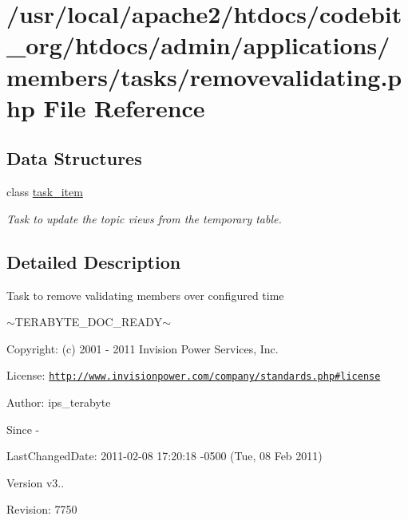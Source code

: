 \hypertarget{removevalidating_8php}{\section{/usr/local/apache2/htdocs/codebit\-\_\-org/htdocs/admin/applications/members/tasks/removevalidating.php File Reference}
\label{removevalidating_8php}
}
\subsection*{Data Structures}
\begin{DoxyCompactItemize}
\item 
class \hyperlink{classtask__item}{task\-\_\-item}
\begin{DoxyCompactList}\small\item\em Task to update the topic views from the temporary table. \end{DoxyCompactList}\end{DoxyCompactItemize}


\subsection{Detailed Description}
\begin{DoxyVerb}  Task to remove validating members over configured time
\end{DoxyVerb}
 $\sim$\-T\-E\-R\-A\-B\-Y\-T\-E\-\_\-\-D\-O\-C\-\_\-\-R\-E\-A\-D\-Y$\sim$ \begin{DoxyParagraph}{Copyright\-:}
(c) 2001 -\/ 2011 Invision Power Services, Inc.
\end{DoxyParagraph}
\begin{DoxyParagraph}{License\-:}
\href{http://www.invisionpower.com/company/standards.php#license}{\tt http\-://www.\-invisionpower.\-com/company/standards.\-php\#license}
\end{DoxyParagraph}
\begin{DoxyParagraph}{Author\-:}
ips\-\_\-terabyte 
\end{DoxyParagraph}
\begin{DoxySince}{Since}
-\/ 
\end{DoxySince}
\begin{DoxyParagraph}{Last\-Changed\-Date\-:}
2011-\/02-\/08 17\-:20\-:18 -\/0500 (Tue, 08 Feb 2011) 
\end{DoxyParagraph}
\begin{DoxyVersion}{Version}
v3.. 
\end{DoxyVersion}
\begin{DoxyParagraph}{Revision\-:}
7750 
\end{DoxyParagraph}
